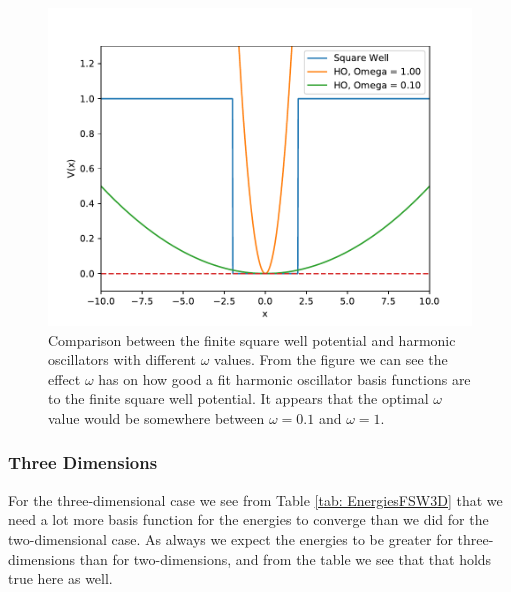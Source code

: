 \documentclass[../main.tex]{subfiles}
\begin{document}
\begin{figure}
\centering
\includegraphics[width=\linewidth]{figures/SW_omega_comp}
\caption{Comparison between the finite square well potential and harmonic oscillators with different $\omega$ values. From the figure we can see the effect $\omega$ has on how good a fit harmonic oscillator basis functions are to the finite square well potential. It appears that the optimal $\omega$ value would be somewhere between $\omega = 0.1$ and $\omega = 1$.}
\label{fig: FSW_omega_comp}
\end{figure}

\subsubsection{Three Dimensions}

For the three-dimensional case we see from Table \ref{tab: EnergiesFSW3D} that we need a lot more basis function for the energies to converge than we did for the two-dimensional case. As always we expect the energies to be greater for three-dimensions than for two-dimensions, and from the table we see that that holds true here as well.
\end{document}
